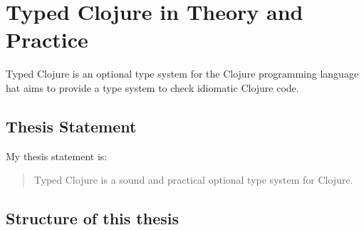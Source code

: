 \chapter*{Typed Clojure in Theory and Practice}

Typed Clojure is an optional type system for the Clojure programming language
hat aims to provide a type system to check idiomatic Clojure code.

\section*{Thesis Statement}

My thesis statement is:

\begin{quote}
Typed Clojure is a sound and practical optional type system for Clojure.
\end{quote}

%

\section*{Structure of this thesis}

